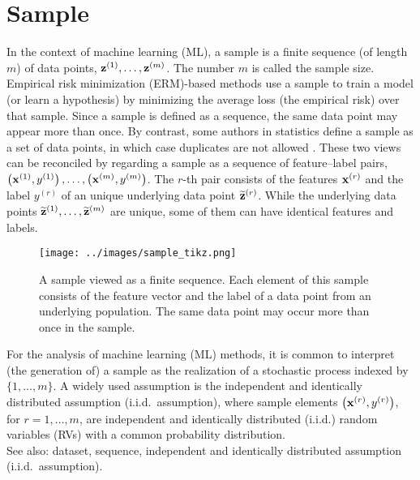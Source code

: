 \documentclass{article}
\begin{document}
\section*{Sample}

In the context of machine learning (ML), a sample is a finite sequence
 (of length $m$) of data points, ${\bf z}^{(1)}, \ldots, {\bf z}^{(m)}$.
 The number $m$ is called the sample size.
 Empirical risk minimization (ERM)-based methods use a sample to train a model (or learn a
 hypothesis) by minimizing the average loss (the empirical risk) over that sample.
 Since a sample is defined as a sequence, the same data point may
 appear more than once. By contrast, some authors in statistics define a sample
 as a set of data points, in which case duplicates are not allowed \cite{Everitt2010,OxfordStatisticsDictionary}.
 These two views can be reconciled by regarding a sample as a sequence of
 feature–label pairs, $\left( {\bf x}^{(1)},y^{(1)} \right), \ldots,
 \left( {\bf x}^{(m)},y^{(m)} \right)$. The $r$-th
 pair consists of the features ${\bf x}^{(r)}$ and the label $y^{(r)}$
 of an unique underlying data point $\widetilde{{\bf z}}^{(r)}$. While the
 underlying data points $\widetilde{{\bf z}}^{(1)},\ldots,\widetilde{{\bf z}}^{(m)}$
 are unique, some of them can have identical features and labels.
 \begin{figure}
 \begin{center}
 \texttt{[image: ../images/sample\_tikz.png]}
 \end{center}
 \caption{A sample viewed as a finite sequence.
 Each element of this sample consists of the feature vector
 and the label of a data point from an underlying population.
 The same data point may occur more than once in the sample.
 \label{fig:sample-sequence_dict}}
 \end{figure}
 For the analysis of machine learning (ML) methods, it is common to interpret (the generation of) a
 sample as the realization of a stochastic process indexed by $\{1,\ldots,m\}$.
 A widely used assumption is the independent and identically distributed assumption (i.i.d.\ assumption), where sample elements
 $\left( {\bf x}^{(r)},y^{(r)} \right)$,
 for $r=1,\ldots,m$, are independent and identically distributed (i.i.d.) random variables (RVs) with a common probability distribution. \\
 See also: dataset, sequence, independent and identically distributed assumption (i.i.d.\ assumption).
\end{document}
